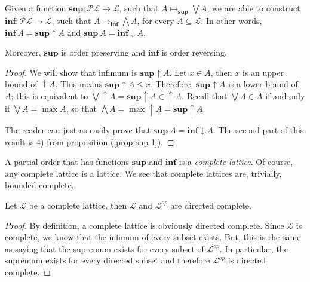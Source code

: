 \documentclass [12pt]{book}
\begin{document}
\begin{theorem}Given a function $\textbf{sup}:\mathcal{PL}\rightarrow\mathcal L$, such that $A\mapsto_{\textbf{sup}}\bigvee A$, we are able to construct $\textbf{inf}:\mathcal{PL}\rightarrow\mathcal L$, such that $A\mapsto_{\textbf{inf}}\bigwedge A$, for every $A\subseteq\mathcal L$. In other words, $\textbf{inf}~A=\textbf{sup}\uparrow A$ and $\textbf{sup}~A=\textbf{inf}\downarrow A$.

Moreover, $\textbf{sup}$ is order preserving and $\textbf{inf}$ is order reversing.\end{theorem}

\begin{proof}We will show that infimum is $\textbf{sup}\uparrow A$.  Let $x\in A$, then $x$ is an upper bound of $\uparrow A$. This means $\textbf{sup}\uparrow A\leq x$. Therefore, $\textbf{sup}\uparrow A$ is a lower bound of $A$; this is equivalent to $\bigvee\uparrow A=\textbf{sup}\uparrow A\in\uparrow A$. Recall that $\bigvee A\in A$ if and only if $\bigvee A=\max A$, so that $\bigwedge A=\max\uparrow A=\textbf{sup}\uparrow A$.

The reader can just as easily prove that $\textbf{sup}~A=\textbf{inf}\downarrow A$. The second part of this result is 4) from proposition (\ref{prop sup 1}).\end{proof}

A partial  order that has functions $\textbf{sup}$ and $\textbf{inf}$ is a \textit{complete lattice}. Of course, any complete lattice is a lattice. We see that complete lattices are, trivially, bounded complete.

\begin{proposition}Let $\mathcal L$ be a complete lattice, then $\mathcal L$ and $\mathcal L^{op}$ are directed complete.\end{proposition}

\begin{proof}By definition, a complete lattice is obviously directed complete. Since $\mathcal L$ is complete, we know that the infimum of every subset exists. But, this is the same as saying that the supremum exists for every subset of $\mathcal L^{op}$. In particular, the supremum exists for every directed subset and therefore $\mathcal L^{op}$ is directed complete.\end{proof}

\end{document}
